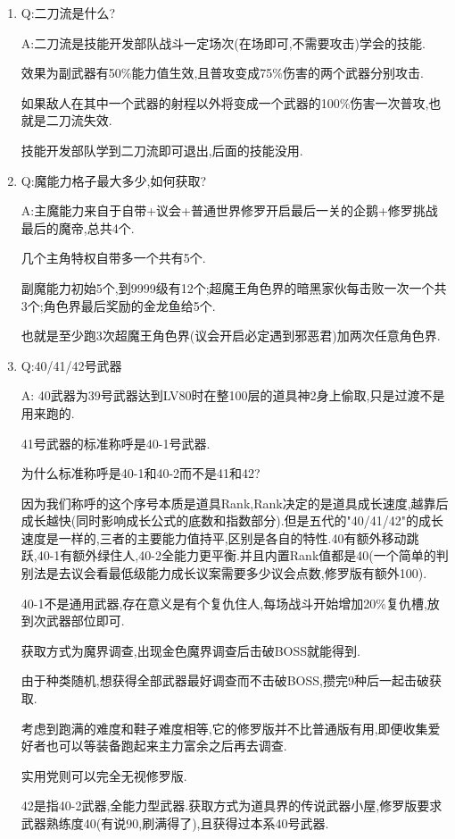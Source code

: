 \begin{enumerate}
	\item
	Q:二刀流是什么?

	A:二刀流是技能开发部队战斗一定场次(在场即可,不需要攻击)学会的技能.

	效果为副武器有50\%能力值生效,且普攻变成75\%伤害的两个武器分别攻击.

	如果敌人在其中一个武器的射程以外将变成一个武器的100\%伤害一次普攻,也就是二刀流失效.

	技能开发部队学到二刀流即可退出,后面的技能没用.

	\item
	Q:魔能力格子最大多少,如何获取?

	A:主魔能力来自于自带+议会+普通世界修罗开启最后一关的企鹅+修罗挑战最后的魔帝,总共4个.

	几个主角特权自带多一个共有5个.
	
	副魔能力初始5个,到9999级有12个;超魔王角色界的暗黑家伙每击败一次一个共3个;角色界最后奖励的金龙鱼给5个.

	也就是至少跑3次超魔王角色界(议会开启必定遇到邪恶君)加两次任意角色界.

	\item
	Q:40/41/42号武器

	A:
	40武器为39号武器达到LV80时在整100层的道具神2身上偷取,只是过渡不是用来跑的.

	41号武器的标准称呼是40-1号武器.

	为什么标准称呼是40-1和40-2而不是41和42?

	因为我们称呼的这个序号本质是道具Rank,Rank决定的是道具成长速度,越靠后成长越快(同时影响成长公式的底数和指数部分).但是五代的"40/41/42"的成长速度是一样的,三者的主要能力值持平,区别是各自的特性.40有额外移动跳跃,40-1有额外绿住人,40-2全能力更平衡.并且内置Rank值都是40(一个简单的判别法是去议会看最低级能力成长议案需要多少议会点数,修罗版有额外100).

	40-1不是通用武器,存在意义是有个复仇住人,每场战斗开始增加20\%复仇槽,放到次武器部位即可.

	获取方式为魔界调查,出现金色魔界调查后击破BOSS就能得到.

	由于种类随机,想获得全部武器最好调查而不击破BOSS,攒完9种后一起击破获取.

	考虑到跑满的难度和鞋子难度相等,它的修罗版并不比普通版有用,即便收集爱好者也可以等装备跑起来主力富余之后再去调查.

	实用党则可以完全无视修罗版.

	42是指40-2武器,全能力型武器.获取方式为道具界的传说武器小屋,修罗版要求武器熟练度40(有说90,刷满得了),且获得过本系40号武器.


\end{enumerate}
